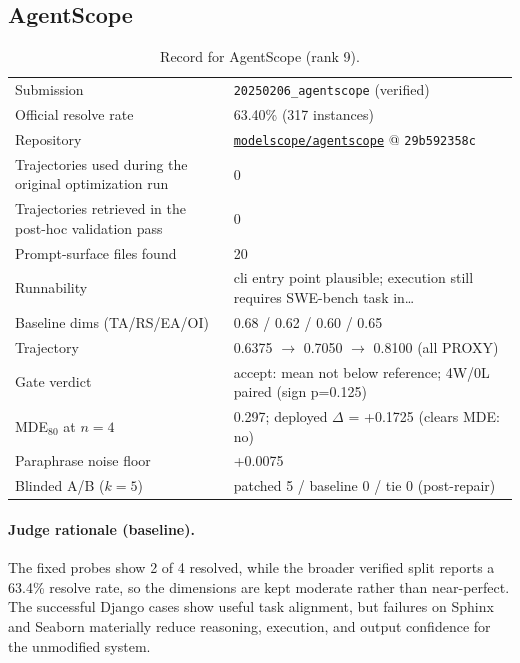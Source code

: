\subsection{AgentScope}
\label{app:agent9}
\begin{table}[H]\centering\scriptsize
\caption{Record for AgentScope (rank 9).}
\begin{tabular}{lp{8.2cm}}\toprule
Submission & \texttt{20250206\_\allowbreak{}agentscope} (verified) \\
Official resolve rate & 63.40\% (317 instances) \\
Repository & \href{https://github.com/modelscope/agentscope}{\texttt{modelscope/agentscope}} @ \texttt{29b592358c} \\
Trajectories used during the original optimization run & 0 \\
Trajectories retrieved in the post-hoc validation pass & 0 \\
Prompt-surface files found & 20 \\
Runnability & cli entry point plausible; execution still requires SWE-bench task in\ldots{} \\
Baseline dims (TA/RS/EA/OI) & 0.68 / 0.62 / 0.60 / 0.65 \\
Trajectory & 0.6375 $\to$ 0.7050 $\to$ 0.8100 (all PROXY) \\
Gate verdict & accept: mean not below reference; 4W/0L paired (sign p=0.125) \\
MDE$_{80}$ at $n{=}4$ & 0.297; deployed $\Delta$ = +0.1725 (clears MDE: no) \\
Paraphrase noise floor & +0.0075 \\
Blinded A/B ($k{=}5$) & patched 5 / baseline 0 / tie 0 (post-repair) \\
\bottomrule\end{tabular}\end{table}
\paragraph{Judge rationale (baseline).}
The fixed probes show 2 of 4 resolved, while the broader verified split reports a 63.4\% resolve rate, so the dimensions are kept moderate rather than near-perfect. The successful Django cases show useful task alignment, but failures on Sphinx and Seaborn materially reduce reasoning, execution, and output confidence for the unmodified system.
